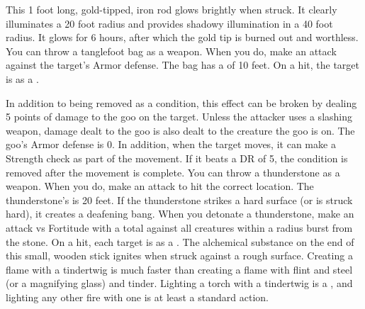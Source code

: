         This 1 foot long, gold-tipped, iron rod glows brightly when struck. It clearly illuminates a 20 foot radius and provides shadowy illumination in a 40 foot radius. It glows for 6 hours, after which the gold tip is burned out and worthless.
         You can throw a tanglefoot bag as a weapon.
        When you do, make an attack against the target's Armor defense.
        The bag has a  of 10 feet.
        On a hit, the target is \slowed as a .
        \par In addition to being removed as a condition, this effect can be broken by dealing 5 points of damage to the goo on the target.
        Unless the attacker uses a slashing weapon, damage dealt to the goo is also dealt to the creature the goo is on.
        The goo's Armor defense is 0. %
        In addition, when the target moves, it can make a Strength check as part of the movement.
        If it beats a DR of 5, the condition is removed after the movement is complete.
         You can throw a thunderstone as a weapon.
        When you do, make an attack to hit the correct location.
        The thunderstone's  is 20 feet.
        If the thunderstone strikes a hard surface (or is struck hard), it creates a deafening bang.
        When you detonate a thunderstone, make an attack vs Fortitude with a  total  against all creatures within a \areasmall radius burst from the stone.
        On a hit, each target is  as a .
         The alchemical substance on the end of this small, wooden stick ignites when struck against a rough surface. Creating a flame with a tindertwig is much faster than creating a flame with flint and steel (or a magnifying glass) and tinder. Lighting a torch with a tindertwig is a , and lighting any other fire with one is at least a standard action.

